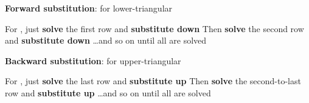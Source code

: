 \begin{itemize}

      \vItem
            \textbf{Forward substitution}: for lower-triangular

            \begin{itemize}

                  \vItem
                        For , just \textbf{solve} the first row
                        and \textbf{substitute down}
                  \vItem
                        Then \textbf{solve} the second row
                        and \textbf{substitute down}
                  \vItem
                        \ldots and so on until all  are solved
            \end{itemize}
      \vItem
            \textbf{Backward substitution}: for upper-triangular

            \begin{itemize}

                  \vItem
                        For , just \textbf{solve} the last row
                        and \textbf{substitute up}
                  \vItem
                        Then \textbf{solve} the second-to-last row
                        and \textbf{substitute up}
                  \vItem
                        \ldots and so on until all  are solved
            \end{itemize}
\end{itemize}